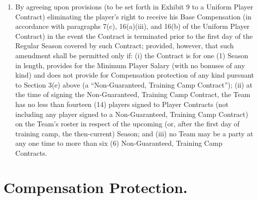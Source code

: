 \documentclass[
]{book}
\begin{document}
\begin{enumerate}
\item
  By agreeing upon provisions (to be set forth in Exhibit 9 to a Uniform Player Contract) eliminating the player's right to receive his Base Compensation (in accordance with paragraphs 7(c), 16(a)(iii), and 16(b) of the Uniform Player Contract) in the event the Contract is terminated prior to the first day of the Regular Season covered by such Contract; provided, however, that such amendment shall be permitted only if: (i) the Contract is for one (1) Season in length, provides for the Minimum Player Salary (with no bonuses of any kind) and does not provide for Compensation protection of any kind pursuant to Section 3(e) above (a ``Non-Guaranteed, Training Camp Contract''); (ii) at the time of signing the Non-Guaranteed, Training Camp Contract, the Team has no less than fourteen (14) players signed to Player Contracts (not including any player signed to a Non-Guaranteed, Training Camp Contract) on the Team's roster in respect of the upcoming (or, after the first day of training camp, the then-current) Season; and (iii) no Team may be a party at any one time to more than six (6) Non-Guaranteed, Training Camp Contracts.
\end{enumerate}

\hypertarget{compensation-protection.}{%
\section{Compensation Protection.}\label{compensation-protection.}}
\end{document}
